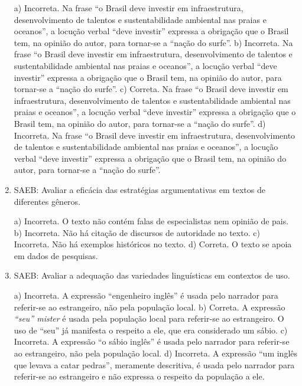 \begin{enumerate}
a) Incorreta. Na frase ``o Brasil deve
investir em infraestrutura, desenvolvimento de talentos e
sustentabilidade ambiental nas praias e oceanos'', a locução verbal ``deve investir'' expressa a obrigação que o Brasil tem, na opinião do autor, para tornar-se a ``nação do surfe''. 
b) Incorreta. Na frase ``o Brasil deve
investir em infraestrutura, desenvolvimento de talentos e
sustentabilidade ambiental nas praias e oceanos'', a locução verbal ``deve investir'' expressa a obrigação que o Brasil tem, na opinião do autor, para tornar-se a ``nação do surfe''.
c) Correta. Na frase ``o Brasil deve
investir em infraestrutura, desenvolvimento de talentos e
sustentabilidade ambiental nas praias e oceanos'', a locução verbal ``deve investir'' expressa a obrigação que o Brasil tem, na opinião do autor, para tornar-se a ``nação do surfe''.
d) Incorreta. Na frase ``o Brasil deve
investir em infraestrutura, desenvolvimento de talentos e
sustentabilidade ambiental nas praias e oceanos'', a locução verbal ``deve investir'' expressa a obrigação que o Brasil tem, na opinião do autor, para tornar-se a ``nação do surfe''.

	\item
SAEB: Avaliar a eficácia das estratégias argumentativas em textos de
diferentes gêneros.

a) Incorreta. O texto não contém falas de especialistas nem opinião de pais.
b) Incorreta. Não há citação de discursos de autoridade no texto.
c) Incorreta. Não há exemplos históricos no texto.
d) Correta. O texto se apoia em dados de pesquisas.

	\item
SAEB: Avaliar a adequação das variedades linguísticas em contextos de uso.

a) Incorreta. A expressão ``engenheiro inglês'' é usada pelo narrador para
referir-se ao estrangeiro, não pela população local.
b) Correta. A expressão \textit{``seu'' mister} é usada pela população local
para referir-se ao estrangeiro. O uso de ``seu'' já manifesta o respeito 
a ele, que era considerado um sábio. 
c) Incorreta. A expressão ``o sábio inglês'' é usada pelo narrador para
referir-se ao estrangeiro, não pela população local.
d) Incorreta. A expressão ``um inglês que levava a catar pedras'', meramente
descritiva, é usada pelo narrador para referir-se ao estrangeiro e não expressa
o respeito da população a ele.

\end{enumerate}
